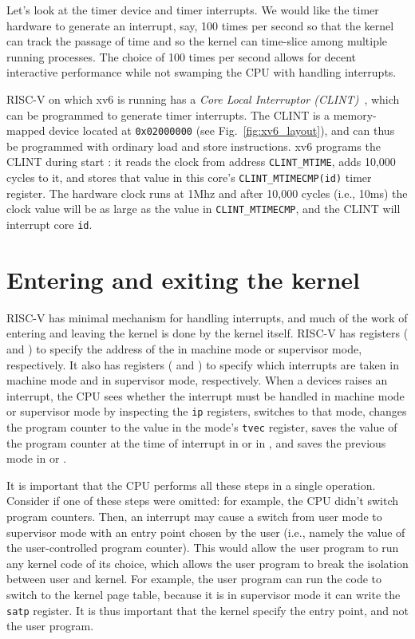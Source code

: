 Let's look at the timer device and timer interrupts.  We would like
the timer hardware to generate an interrupt, say, 100 times per
second so that the kernel can track the passage of time and so the
kernel can time-slice among multiple running processes.  The choice of
100 times per second allows for decent interactive performance while
not swamping the CPU with handling interrupts.

RISC-V on which xv6 is running has a \textit{Core Local
  Interruptor (CLINT)}~\cite{u54}, which
can be programmed to generate timer interrupts.  The CLINT is a
memory-mapped device located at \lstinline{0x02000000} (see
Fig.~\ref{fig:xv6_layout}), and can thus be programmed with ordinary
load and store instructions.  xv6 programs the CLINT during start
: it reads the clock from address
\lstinline{CLINT_MTIME}, adds 10,000 cycles to it, and stores that
value in this core's \lstinline{CLINT_MTIMECMP(id)} timer register.
The hardware clock runs at 1Mhz and after 10,000 cycles (i.e., 10ms)
the clock value will be as large as the value in
\lstinline{CLINT_MTIMECMP}, and the CLINT will interrupt core
\lstinline{id}.

\section{Entering and exiting the kernel}

RISC-V has minimal mechanism for handling interrupts,
and much of the work of entering and leaving the kernel is done by the kernel
itself.   RISC-V has registers ( and
) to specify the address of the  in machine mode or supervisor mode, respectively.  It also
has registers ( and ) to specify which
interrupts are taken in machine mode and in supervisor mode,
respectively.  When a devices raises an interrupt, the CPU sees
whether the interrupt must be handled in machine mode or supervisor
mode by inspecting the \lstinline{ip} registers, switches to that
mode, changes the program counter to the value in the mode's
\lstinline{tvec} register, saves the value of the program counter at
the time of interrupt in  or in , and
saves the previous mode in  or .

It is important that the CPU performs all these steps in a
single operation.  Consider if one of these steps were omitted: for
example, the CPU didn't switch program counters.  Then, an
interrupt may cause a switch from user mode to supervisor mode with an
entry point chosen by the user (i.e., namely the value of the
user-controlled program counter).  This would allow the user program
to run any kernel code of its choice, which allows the user program to
break the isolation between user and kernel. For example, the user
program can run the code to switch to the kernel page table, because
it is in supervisor mode it can write the \lstinline{satp} register.  It
is thus important that the kernel specify the entry point, and not the
user program.

